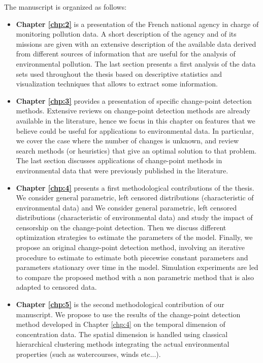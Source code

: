 The manuscript is organized as follows:
\begin{itemize}
\item{\textbf{Chapter \ref{chp:2}}} is a presentation of the French national agency in charge of monitoring pollution data. A short description of the agency and of its missions are given with an extensive description of the available data derived from different sources of information that are useful for the analysis of environmental pollution. The last section presents a first analysis of the data sets used throughout the thesis based on descriptive statistics and visualization techniques that allows to extract some information.
\item{\textbf{Chapter \ref{chp:3}}} provides a presentation of specific change-point detection methods. Extensive reviews on change-point detection  methods  are already  available in the literature,  hence we  focus  in this chapter on  features  that  we believe could  be  useful  for applications  to  environmental  data. In particular, we cover the case where the number of changes is unknown, and review search methods (or heuristics) that give an optimal solution to that problem. The last section discusses applications of change-point methods in environmental data that were previously published in the literature.
\item{\textbf{Chapter \ref{chp:4}}} presents a first methodological contributions of the thesis. 
We consider general parametric, left censored distributions (characteristic of environmental data) and We consider general parametric, left censored distributions (characteristic of environmental data) and study the impact of censorship on the change-point detection.  Then we discuss different optimization strategies to estimate the parameters of the model. Finally, we propose an original change-point detection method, involving an iterative procedure to estimate to estimate both piecewise constant parameters and parameters stationary over time in the model.  Simulation experiments are led to compare the proposed method with a non parametric method that is also adapted to censored data. 
\item{\textbf{Chapter \ref{chp:5}}} is the second methodological contribution of our manuscript. We propose to use the results of the change-point detection method developed in Chapter \ref{chp:4} on the temporal dimension of concentration data. The spatial dimension is handled using classical hierarchical clustering methods integrating the actual environmental properties (such as watercourses, winds etc...).

\end{itemize}
